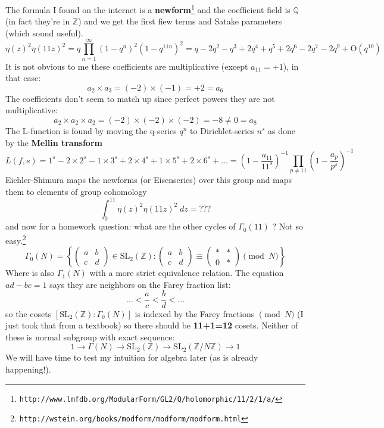 \documentclass[12pt]{article}
\begin{document}
\newpage

\noindent The formula I found on the internet is a \textbf{newform}\footnote{\texttt{http://www.lmfdb.org/ModularForm/GL2/Q/holomorphic/11/2/1/a/}} and the coefficient field is $\mathbb{Q}$ (in fact they're in $\mathbb{Z}$) and we get the first fiew terms and Satake parameters (which sound useful). 
$$ \eta(z)^2 \eta(11z)^2 = q \prod_{n=1}^\infty (1-q^n)^2 (1 - q^{11n})^2  = q - 2q^2 - q^3 + 2q^4 + q^5 + 2 q^6 - 2 q^7 - 2q^9 + \text{O}(q^{10})$$
It is not obvious to me these coefficients are multiplicative (except $a_{11} = +1$), in that case:
$$ a_2 \times a_3 = (-2) \times (-1) = + 2 = a_6 $$
The coefficients don't seem to match up since perfect powers they are not multiplicative:
$$ a_2 \times a_2 \times a_2 = (-2)\times (-2)\times (-2) = -8 \neq 0 = a_8 $$
The L-function is found by moving the q-series $q^n$ to Dirichlet-series $n^s$ as done by the \textbf{Mellin transform}
$$ L(f,s) = 1^s -2 \times 2^s - 1 \times 3^s + 2 \times 4^s + 1 \times 5^s + 2 \times 6^s  + \dots = \left( 1 - \frac{a_{11}}{11^s} \right)^{-1} \prod_{p \neq 11} \left( 1 - \frac{a_p}{p^s} \right)^{-1} $$
Eichler-Shimura maps the newforms (or Eisenseries) over this group and maps them to elements of group cohomology
$$ \int_0^{11} \eta(z)^2 \eta(11z)^2 \; dz = \text{???} $$
and now for a homework question: what are the other cycles of $\Gamma_0(11)$ ? Not so easy.\footnote{\texttt{http://wstein.org/books/modform/modform/modform.html}}
$$ \Gamma_0(N) = \left\{ \left( \begin{array}{cc} a & b \\ c & d \end{array}   \right) \in \text{SL}_2(\mathbb{Z}) : 
\left( \begin{array}{cc} a & b \\ c & d \end{array}   \right)  \equiv
\left( \begin{array}{cc} \ast & \ast \\ 0 &  \ast  \end{array}  \right) \pmod{ N }
 \right\} $$
 Where is also $\Gamma_1(N)$ with a more strict equivalence relation.   The equation $ad-bc=1$ says they are neighbors on the Farey fraction list:
 $$ \dots  < \frac{a}{c} <  \frac{b}{d} < \dots $$
so the cosets $[\text{SL}_2(\mathbb{Z}) : \Gamma_0(N)]$ is indexed by the Farey fractions $\pmod {N}$ (I just took that from a textbook) so there should be \textbf{11+1=12} cosets.  Neither of these is normal subgroup with exact sequence:
$$ 1 \to \Gamma(N) \to \text{SL}_2(\mathbb{Z}) \to \text{SL}_2( \mathbb{Z}/N\mathbb{Z}) \to 1 $$
We will have time to test my intuition for algebra later (as is already happening!). \\
\end{document}
